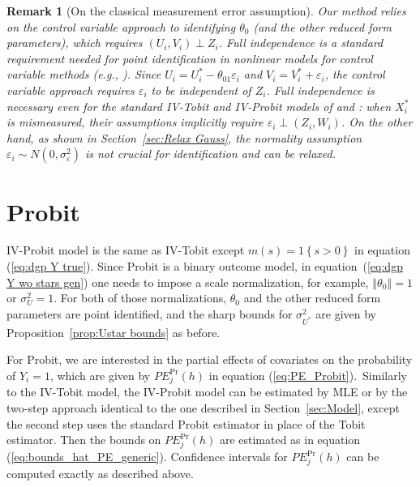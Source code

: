 \documentclass[12pt]{article}
\newtheorem{remark}{Remark}
\begin{document}
\begin{remark}[On the classical measurement error assumption]
  Our method relies on the control variable approach to identifying $\theta_0$ (and the other reduced form parameters), which requires $(U_i,V_i) \perp Z_i$. Full independence is a standard requirement needed for point identification in nonlinear models for control variable methods (e.g., \citealp{ImbensNewey2009Ecta}). Since $U_i = U_i^* - \theta_{01} \varepsilon_i$ and $V_i = V_i^* + \varepsilon_i$, the control variable approach requires $\varepsilon_i$ to be independent of $Z_i$. Full independence is necessary even for the standard IV-Tobit and IV-Probit models of \citet{SmithBlundell1986Ecta} and \citet{RiversVuong1988JoE}: when $X_i^*$ is mismeasured, their assumptions implicitly require $\varepsilon_i \perp (Z_i, W_i)$. On the other hand, as shown in Section~\ref{sec:Relax Gauss}, the normality assumption $\varepsilon_i \sim N (0,\sigma_\varepsilon^2)$ is not crucial for identification and can be relaxed.
\end{remark}


\section{Probit}\label{sec:Probit}

IV-Probit model is the same as IV-Tobit except $m\left( s\right) =1\left\{ s>0\right\} $ in equation (\ref{eq:dgp Y true}). Since Probit is a binary outcome model, in equation~(\ref{eq:dgp Y wo stars gen}) one needs to impose a scale normalization, for example, $\left\Vert \theta _{0}\right\Vert =1$ or $\sigma_{U}^2 = 1$. For both of those normalizations, $\theta_0$ and the other reduced form parameters are point identified, and the sharp bounds for $\sigma_{U^*}^2$ are given by Proposition~\ref{prop:Ustar bounds} as before.

For Probit, we are interested in the partial effects of
covariates on the probability of $Y_{i}=1$, which are given by $PE_{j}^{\Pr
}\left( h\right) $ in equation (\ref{eq:PE_Probit}).\ Similarly to the
IV-Tobit model, the IV-Probit model can be estimated by MLE or by the
two-step approach identical to the one described in Section~\ref{sec:Model},
except the second step uses the standard Probit estimator in place of the
Tobit estimator. Then the bounds on $PE_{j}^{\Pr }\left( h\right) $ are
estimated as in equation (\ref{eq:bounds_hat_PE_generic}).%
{}
Confidence intervals for $PE_{j}^{\Pr }(h)$ can be computed exactly as
described above.
\end{document}
